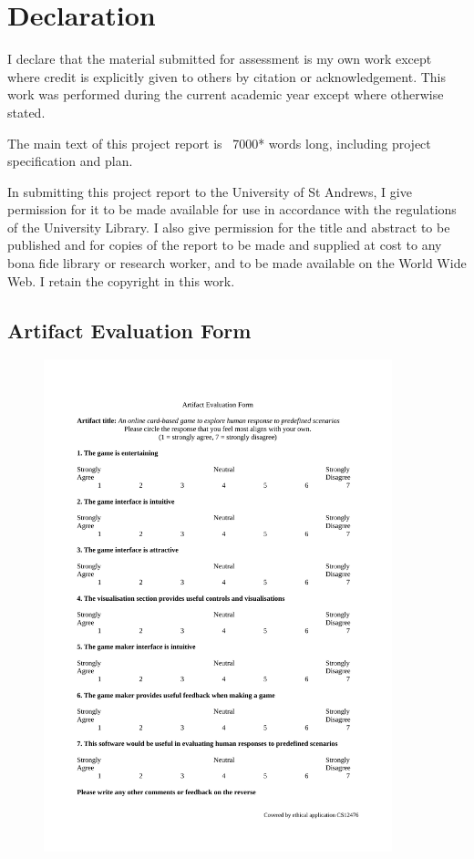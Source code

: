 \documentclass[]{report}
\begin{document}
\section{Declaration}
I declare that the material submitted for
assessment is my own work except where credit is
explicitly given to others by citation or
acknowledgement. This work was performed during
the current academic year except where otherwise
stated.

The main text of this project report is  ~7000* words long, including project specification and plan.

In submitting this project report to the University of
St Andrews, I give permission for it to be made
available for use in accordance with the regulations of
the University Library. I also give permission for
the title and abstract to be published and for copies of
the report to be made and supplied at cost to any bona
fide library or research worker, and to be made
available on the World Wide Web. I retain the
copyright in this work.

\listoftodos











\nocite{*}
\printbibliography

\begin{appendices}
  \section{Artifact Evaluation Form}
  \begin{figure}[!h]
    \centering
    \includegraphics[width=0.9\textwidth]{./appendices/feedback.pdf}
    \label{appendix:artifact_eval}
  \end{figure}
\end{appendices}
\end{document}
